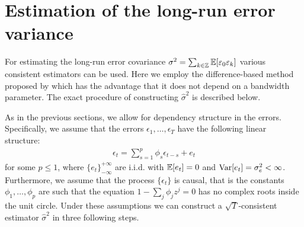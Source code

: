 \documentclass[a4paper,12pt]{article}
\numberwithin{equation}{section}
\begin{document}


\newpage
\section{Estimation of the long-run error variance}\label{sec-error-var}

For estimating the long-run error covariance $\sigma^2 = \sum_{k \in \mathbb{Z}} \mathbb{E}[\varepsilon_0 \varepsilon_k]$ various consistent estimators can be used. Here we employ the difference-based method proposed by \cite{Hall2003} which has the advantage that it does not depend on a bandwidth parameter. The exact procedure of constructing $\hat{\sigma}^2$ is described below.

As in the previous sections, we allow for dependency structure in the errors. Specifically, we assume that the errors $\epsilon_1, \ldots, \epsilon_T$ have the following linear structure:
\begin{align*}
\epsilon_t = \sum_{s=1}^{p} \phi_s \epsilon_{t-s} + e_t
\end{align*}
for some $p \le 1$, where $\{e_t\}_{-\infty}^{+\infty}$ are i.i.d. with $\mathbb{E}[e_t] = 0$ and $\textnormal{Var}[e_t] = \sigma^2_e < \infty$. Furthermore, we assume that the process $\{\epsilon_t\}$ is causal, that is the constants $\phi_1, \ldots, \phi_p$ are such that the equation $1-\sum_{j}\phi_j z^j = 0$ has no complex roots inside the unit circle. Under these assumptions we can construct a $\sqrt{T}$-consistent estimator $\hat{\sigma}^2$ in three following steps.
\vspace{1pt}
\end{document}
